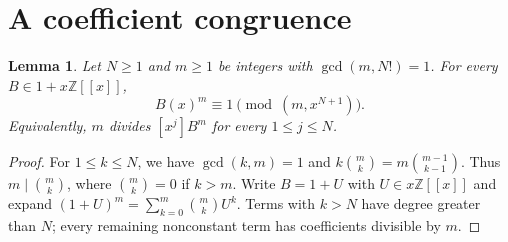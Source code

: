 \documentclass[11pt]{article}
\newtheorem{lemma}[theorem]{Lemma}
\newcommand{\coeff}[1]{[x^{#1}]}
\begin{document}
\section{A coefficient congruence}
\begin{lemma}\label{lem:low}
Let $N\ge1$ and $m\ge1$ be integers with $\gcd(m,N!)=1$.
For every $B\in1+x\mathbb Z[[x]]$,
\[
 B(x)^m\equiv1\pmod{(m,x^{N+1})}.
\]
Equivalently, $m$ divides $\coeff j B^m$ for every $1\le j\le N$.
\end{lemma}
\begin{proof}
For $1\le k\le N$, we have $\gcd(k,m)=1$ and
$k\binom mk=m\binom{m-1}{k-1}$. Thus $m\mid\binom mk$,
where $\binom mk=0$ if $k>m$.
Write $B=1+U$ with $U\in x\mathbb Z[[x]]$ and expand
$(1+U)^m=\sum_{k=0}^m\binom mkU^k$.
Terms with $k>N$ have degree greater than $N$; every remaining nonconstant
term has coefficients divisible by $m$.
\end{proof}
\end{document}
